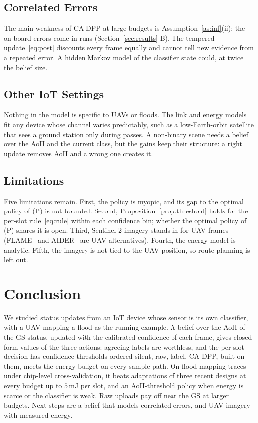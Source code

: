 \documentclass[journal]{IEEEtran}
\theoremstyle{remark}
\begin{document}
\subsection{Correlated Errors}
The main weakness of CA-DPP at large budgets is Assumption~\ref{as:inf}(ii): the on-board errors come in runs (Section~\ref{sec:results}-B). The tempered update~\eqref{eq:post} discounts every frame equally and cannot tell new evidence from a repeated error. A hidden Markov model of the classifier state could, at twice the belief size.

\subsection{Other IoT Settings}
Nothing in the model is specific to UAVs or floods. The link and energy models fit any device whose channel varies predictably, such as a low-Earth-orbit satellite that sees a ground station only during passes. A non-binary scene needs a belief over the AoII and the current class, but the gains keep their structure: a right update removes AoII and a wrong one creates it.

\subsection{Limitations}
Five limitations remain. First, the policy is myopic, and its gap to the optimal policy of (P) is not bounded. Second, Proposition~\ref{prop:threshold} holds for the per-slot rule~\eqref{eq:rule} within each confidence bin; whether the optimal policy of (P) shares it is open. Third, Sentinel-2 imagery stands in for UAV frames (FLAME~\cite{shamsoshoara2021flame} and AIDER~\cite{kyrkou2020aider} are UAV alternatives). Fourth, the energy model is analytic. Fifth, the imagery is not tied to the UAV position, so route planning is left out.

\section{Conclusion}\label{sec:concl}
We studied status updates from an IoT device whose sensor is its own classifier, with a UAV mapping a flood as the running example. A belief over the AoII of the GS status, updated with the calibrated confidence of each frame, gives closed-form values of the three actions: agreeing labels are worthless, and the per-slot decision has confidence thresholds ordered silent, raw, label. CA-DPP, built on them, meets the energy budget on every sample path. On flood-mapping traces under chip-level cross-validation, it beats adaptations of three recent designs at every budget up to $5$\,mJ per slot, and an AoII-threshold policy when energy is scarce or the classifier is weak. Raw uploads pay off near the GS at larger budgets. Next steps are a belief that models correlated errors, and UAV imagery with measured energy.
\end{document}
